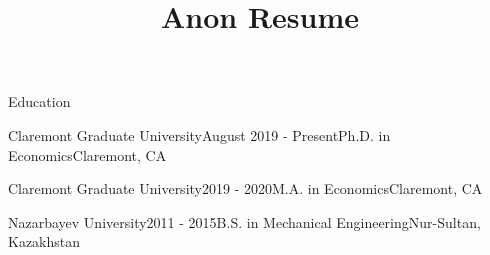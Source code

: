 \documentclass{resume} %
\begin{document}
\title{Anon Resume}

\begin{rSection}{Education}

\begin{rSubsection}{Claremont Graduate University}{August 2019 - Present}{Ph.D. in Economics}{Claremont, CA}



\vspace{-.90cm}
\item[]
\end{rSubsection}
\begin{rSubsection}{Claremont Graduate University}{2019 - 2020}{M.A. in Economics}{Claremont, CA}



\vspace{-.90cm}
\item[]
\end{rSubsection}

\begin{rSubsection}{Nazarbayev University}{2011 - 2015}{B.S. in Mechanical Engineering}{Nur-Sultan, Kazakhstan}



\vspace{-.90cm}
\item[]
\end{rSubsection}

\end{rSection}

\end{document}
